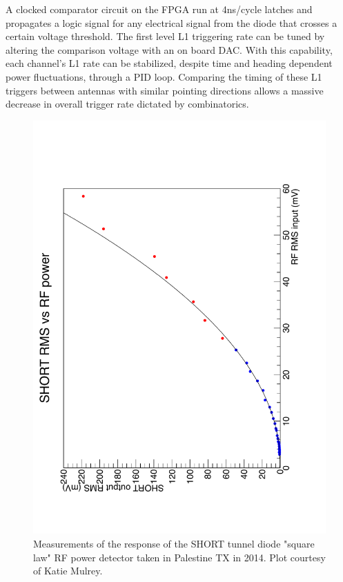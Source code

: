 		A clocked comparator circuit on the FPGA run at 4ns/cycle latches and propagates a logic signal for any electrical signal from the diode that crosses a certain voltage threshold.  The first level L1 triggering rate can be tuned by altering the comparison voltage with an on board DAC. With this capability, each channel's L1 rate can be stabilized, despite time and heading dependent power fluctuations, through a PID loop.  Comparing the timing of these L1 triggers between antennas with similar pointing directions allows a massive decrease in overall trigger rate dictated by combinatorics.
		
\begin{figure}
	\centering
	\includegraphics[height=0.8\textheight,angle=-90]{figures/RMS_in_out}
	\caption{Measurements of the response of the SHORT tunnel diode "square law" RF power detector taken in Palestine TX in 2014.  Plot courtesy of Katie Mulrey.}
	\label{fig:SHORT_square}
\end{figure}
		
